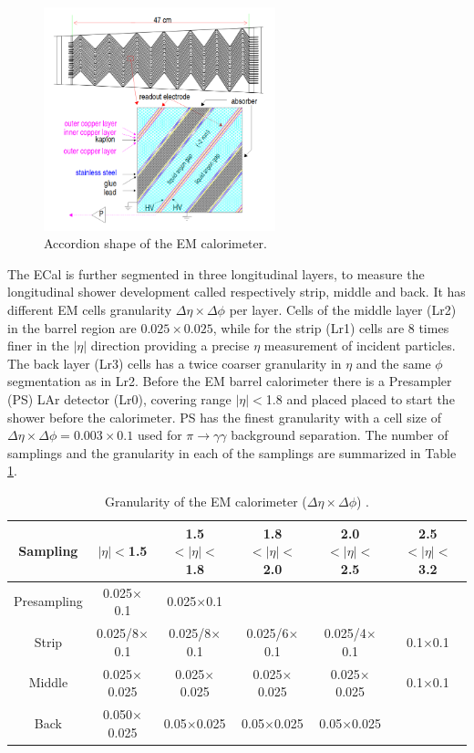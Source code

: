 \begin{figure}[htbp]
    \centering
    \includegraphics[width=0.6\textwidth]{Ch2/Img/ECal_accord.png}
    \caption{Accordion shape of the EM calorimeter.}
    \label{fig:chap2:ATLAS:Calo:ECal:Acc}
\end{figure}
The ECal is further segmented in three longitudinal layers, to measure the longitudinal shower development called respectively strip, middle and back. It has different EM cells granularity $\Delta\eta\times\Delta\phi$ per layer. Cells of the middle layer (Lr2) in the barrel region are $0.025\times0.025$, while for the strip (Lr1) cells are 8 times finer in the $|\eta|$ direction providing a precise $\eta$ measurement of incident particles. The back layer (Lr3) cells has a twice coarser granularity in $\eta$ and the same $\phi$ segmentation as in Lr2. Before the EM barrel calorimeter there is a Presampler (PS) LAr detector (Lr0), covering range $|\eta|<$1.8 and placed placed to start the shower before the calorimeter. PS has the finest granularity with a cell size of $\Delta\eta\times\Delta\phi = 0.003\times0.1$ used for $\pi\rightarrow\gamma\gamma$ background separation. The number of samplings  and the granularity in each of the samplings are summarized in Table \ref{tab:chap2:ATLAS:Calo:ECal:Gr}.
\begin{table}[htbp]
    \centering
    \begin{tabular}{cccccc}
    \hline
    Sampling & $|\eta|<$1.5 & 1.5$<|\eta|<$1.8 & 1.8$<|\eta|<$2.0 & 2.0$<|\eta|<$2.5 & 2.5$<|\eta|<$3.2 \\
    \hline
    \hline
        Presampling & 0.025$\times$0.1 & 0.025$\times$0.1  \\
        Strip & 0.025/8$\times$0.1 & 0.025/8$\times$0.1 & 0.025/6$\times$0.1 & 0.025/4$\times$0.1 & 0.1$\times$0.1 \\
        Middle & 0.025$\times$0.025 & 0.025$\times$0.025 & 0.025$\times$0.025 & 0.025$\times$0.025 & 0.1$\times$0.1 \\
        Back & 0.050$\times$0.025 & 0.05$\times$0.025 & 0.05$\times$0.025 & 0.05$\times$0.025 \\
        \hline
    \end{tabular}
    \caption{Granularity of the EM calorimeter ($\Delta\eta\times\Delta\phi$) \cite{LAr_TRD}.}
    \label{tab:chap2:ATLAS:Calo:ECal:Gr}
\end{table}
